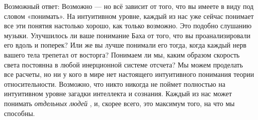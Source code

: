 \documentclass[../main.tex]{subfiles}
\begin{document}
Возможный ответ: Возможно --- но всё зависит от того, что вы имеете в виду под словом «понимать». На интуитивном уровне, каждый из нас уже сейчас понимает все эти понятия настолько хорошо, как только возможно. Это подобно слушанию музыки. Улучшилось ли ваше понимание Баха от того, что вы проанализировали его вдоль и поперек? Или же вы лучше понимали его тогда, когда каждый нерв вашего тела трепетал от восторга? Понимаем ли мы, каким образом скорость света постоянна в любой инерционной системе отсчета? Мы можем проделать все расчеты, но ни у кого в мире нет настоящего интуитивного понимания теории относительности. Возможно, что никто никогда не поймет полностью на интуитивном уровне загадки интеллекта и сознания. Каждый из нас может понимать \emph{отдельных людей} , и, скорее всего, это максимум того, на что мы способны.
\end{document}
